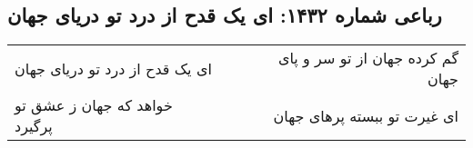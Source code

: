 \begin{center}
\section*{رباعی شماره ۱۴۳۲: ای یک قدح از درد تو دریای جهان}
\label{sec:1432}
\begin{longtable}{l p{0.5cm} r}
ای یک قدح از درد تو دریای جهان
&&
گم کرده جهان از تو سر و پای جهان
\\
خواهد که جهان ز عشق تو پرگیرد
&&
ای غیرت تو ببسته پرهای جهان
\\
\end{longtable}
\end{center}
